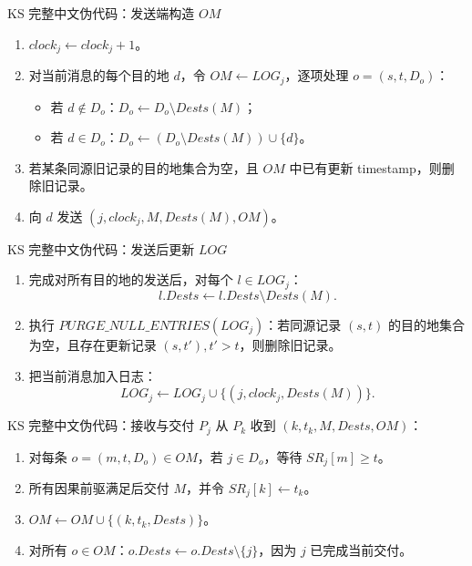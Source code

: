 \documentclass[UTF8,fontset=none,aspectratio=169,10pt]{beamer}
\begin{document}
{\begin{frame}{KS 完整中文伪代码：发送端构造 $OM$}
\scriptsize
\begin{enumerate}
  \item $clock_j\leftarrow clock_j+1$。
  \item 对当前消息的每个目的地 $d$，令 $OM\leftarrow LOG_j$，逐项处理 $o=(s,t,D_o)$：
  \begin{itemize}\scriptsize
    \item 若 $d\notin D_o$：$D_o\leftarrow D_o\setminus Dests(M)$；
    \item 若 $d\in D_o$：$D_o\leftarrow(D_o\setminus Dests(M))\cup\{d\}$。
  \end{itemize}
  \item 若某条同源旧记录的目的地集合为空，且 $OM$ 中已有更新 timestamp，则删除旧记录。
  \item 向 $d$ 发送 $(j,clock_j,M,Dests(M),OM)$。
\end{enumerate}
\normalsize
\vfill
{}
\end{frame}

\begin{frame}{KS 完整中文伪代码：发送后更新 $LOG$}
\scriptsize
\begin{enumerate}
  \item 完成对所有目的地的发送后，对每个 $l\in LOG_j$：
  \[
  l.Dests\leftarrow l.Dests\setminus Dests(M).
  \]
  \item 执行 $PURGE\_NULL\_ENTRIES(LOG_j)$：若同源记录 $(s,t)$ 的目的地集合为空，且存在更新记录 $(s,t'),t'>t$，则删除旧记录。
  \item 把当前消息加入日志：
  \[
  LOG_j\leftarrow LOG_j\cup\{(j,clock_j,Dests(M))\}.
  \]
\end{enumerate}
\normalsize
\vfill
{}
\end{frame}

\begin{frame}{KS 完整中文伪代码：接收与交付}
\scriptsize
$P_j$ 从 $P_k$ 收到 $(k,t_k,M,Dests,OM)$：
\begin{enumerate}
  \item 对每条 $o=(m,t,D_o)\in OM$，若 $j\in D_o$，等待 $SR_j[m]\ge t$。
  \item 所有因果前驱满足后交付 $M$，并令 $SR_j[k]\leftarrow t_k$。
  \item $OM\leftarrow OM\cup\{(k,t_k,Dests)\}$。
  \item 对所有 $o\in OM$：$o.Dests\leftarrow o.Dests\setminus\{j\}$，因为 $j$ 已完成当前交付。
\end{enumerate}
\normalsize
\vfill
{}
\end{frame}

}
\end{document}
